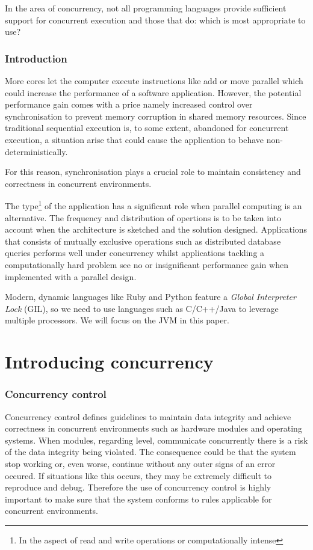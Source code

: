 \documentclass[a4paper,12pt]{kth-mag}
\begin{document}
In the area of concurrency, not all programming languages provide sufficient support for concurrent execution and those that do: which is most appropriate to use?

\section{Introduction}
More cores let the computer execute instructions like add or move parallel which could increase the performance of a software application. However, the potential performance gain comes with a price namely increased control over synchronisation to prevent memory corruption in shared memory resources. Since traditional sequential execution is, to some extent, abandoned for concurrent execution, a situation arise that could cause the application to behave non-deterministically.

For this reason, synchronisation plays a crucial role to maintain consistency and correctness in concurrent environments.

The type\footnote{In the aspect of read and write operations or computationally intense} of the application has a significant role when parallel computing is an alternative. The frequency and distribution of opertions is to be taken into account when the architecture is sketched and the solution designed. Applications that consists of mutually exclusive operations such as distributed database queries performs well under concurrency whilst applications tackling a computationally hard problem see no or insignificant performance gain when implemented with a parallel design.

Modern, dynamic languages like Ruby and Python feature a \textit{Global Interpreter Lock} (GIL), so we need to use languages such as C/C++/Java to leverage multiple processors. We will focus on the JVM in this paper.  

\part{Introducing concurrency}

\section{Concurrency control} \label{sec:con_con}
Concurrency control defines guidelines to maintain data integrity and achieve correctness in concurrent environments such as hardware modules and operating systems\cite{concon}. When modules, regarding level, communicate concurrently there is a risk of the data integrity being violated. The consequence could be that the system stop working or, even worse, continue without any outer signs of an error occured. If situations like this occurs, they may be extremely difficult to reproduce and debug. Therefore the use of concurrency control is highly important to make sure that the system conforms to rules applicable for concurrent environments.
\end{document}
